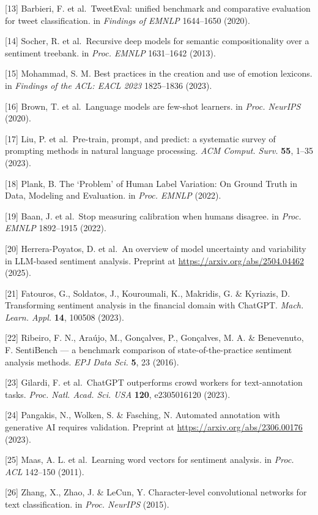 \documentclass[11pt]{article}
\begin{document}
{[}13{]} Barbieri, F. et al.~TweetEval: unified benchmark and
comparative evaluation for tweet classification. in \emph{Findings of
EMNLP} 1644--1650 (2020).

{[}14{]} Socher, R. et al.~Recursive deep models for semantic
compositionality over a sentiment treebank. in \emph{Proc. EMNLP}
1631--1642 (2013).

{[}15{]} Mohammad, S. M. Best practices in the creation and use of
emotion lexicons. in \emph{Findings of the ACL: EACL 2023} 1825--1836
(2023).

{[}16{]} Brown, T. et al.~Language models are few-shot learners. in
\emph{Proc. NeurIPS} (2020).

{[}17{]} Liu, P. et al.~Pre-train, prompt, and predict: a systematic
survey of prompting methods in natural language processing. \emph{ACM
Comput. Surv.} \textbf{55}, 1--35 (2023).

{[}18{]} Plank, B. The `Problem' of Human Label Variation: On Ground
Truth in Data, Modeling and Evaluation. in \emph{Proc. EMNLP} (2022).

{[}19{]} Baan, J. et al.~Stop measuring calibration when humans
disagree. in \emph{Proc. EMNLP} 1892--1915 (2022).

{[}20{]} Herrera-Poyatos, D. et al.~An overview of model uncertainty and
variability in LLM-based sentiment analysis. Preprint at
\url{https://arxiv.org/abs/2504.04462} (2025).

{[}21{]} Fatouros, G., Soldatos, J., Kouroumali, K., Makridis, G. \&
Kyriazis, D. Transforming sentiment analysis in the financial domain
with ChatGPT. \emph{Mach. Learn. Appl.} \textbf{14}, 100508 (2023).

{[}22{]} Ribeiro, F. N., Araújo, M., Gonçalves, P., Gonçalves, M. A. \&
Benevenuto, F. SentiBench --- a benchmark comparison of
state-of-the-practice sentiment analysis methods. \emph{EPJ Data Sci.}
\textbf{5}, 23 (2016).

{[}23{]} Gilardi, F. et al.~ChatGPT outperforms crowd workers for
text-annotation tasks. \emph{Proc. Natl. Acad. Sci. USA} \textbf{120},
e2305016120 (2023).

{[}24{]} Pangakis, N., Wolken, S. \& Fasching, N. Automated annotation
with generative AI requires validation. Preprint at
\url{https://arxiv.org/abs/2306.00176} (2023).

{[}25{]} Maas, A. L. et al.~Learning word vectors for sentiment
analysis. in \emph{Proc. ACL} 142--150 (2011).

{[}26{]} Zhang, X., Zhao, J. \& LeCun, Y. Character-level convolutional
networks for text classification. in \emph{Proc. NeurIPS} (2015).
\end{document}
